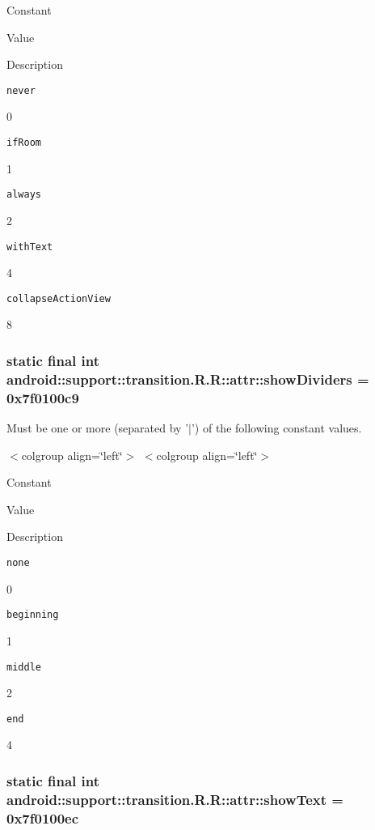 Constant

Value

Description 

{\tt never}

0

{\tt ifRoom}

1

{\tt always}

2

{\tt withText}

4

{\tt collapseActionView}

8\hypertarget{classandroid_1_1support_1_1transition_1_1_r_1_1attr_63132660ad65a72eac27ed7b0a4a8043}{
\subsubsection[{showDividers}]{\setlength{\rightskip}{0pt plus 5cm}static final int android::support::transition.R.R::attr::showDividers = 0x7f0100c9}}
\label{classandroid_1_1support_1_1transition_1_1_r_1_1attr_63132660ad65a72eac27ed7b0a4a8043}


Must be one or more (separated by '$|$') of the following constant values. \begin{TabularC}{0}
\hline
\end{TabularC}
$<$colgroup align=\char`\"{}left\char`\"{}$>$ $<$colgroup align=\char`\"{}left\char`\"{}$>$ 

Constant

Value

Description 

{\tt none}

0

{\tt beginning}

1

{\tt middle}

2

{\tt end}

4\hypertarget{classandroid_1_1support_1_1transition_1_1_r_1_1attr_1b6397aea01754a237488a261b29d618}{
\subsubsection[{showText}]{\setlength{\rightskip}{0pt plus 5cm}static final int android::support::transition.R.R::attr::showText = 0x7f0100ec}}
\label{classandroid_1_1support_1_1transition_1_1_r_1_1attr_1b6397aea01754a237488a261b29d618}



